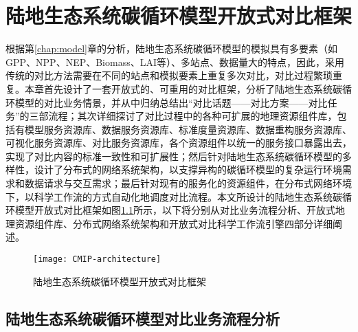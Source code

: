 \chapter{陆地生态系统碳循环模型开放式对比框架}

根据第\ref{chap:model}章的分析，陆地生态系统碳循环模型的模拟具有多要素（如GPP、NPP、NEP、Biomass、LAI等）、多站点、数据量大的特点，因此，采用传统的对比方法需要在不同的站点和模拟要素上重复多次对比，对比过程繁琐重复。本章首先设计了一套开放式的、可重用的对比框架，分析了陆地生态系统碳循环模型的对比业务情景，并从中归纳总结出“对比话题——对比方案——对比任务”的三部流程；其次详细探讨了对比过程中的各种可扩展的地理资源组件库，包括有模型服务资源库、数据服务资源库、标准度量资源库、数据重构服务资源库、可视化服务资源库、对比服务资源库，各个资源组件以统一的服务接口暴露出去，实现了对比内容的标准一致性和可扩展性；然后针对陆地生态系统碳循环模型的多样性，设计了分布式的网络系统架构，以支撑异构的碳循环模型的复杂运行环境需求和数据请求与交互需求；最后针对现有的服务化的资源组件，在分布式网络环境下，以科学工作流的方式自动化地调度对比流程。本文所设计的陆地生态系统碳循环模型开放式对比框架如图\ref{fig:CMIP-architecture}所示，以下将分别从对比业务流程分析、开放式地理资源组件库、分布式网络系统架构和开放式对比科学工作流引擎四部分详细阐述。

\begin{figure}
    \centering
    \texttt{[image: CMIP-architecture]}
    \caption{陆地生态系统碳循环模型开放式对比框架}
    \label{fig:CMIP-architecture}
\end{figure}

\section{陆地生态系统碳循环模型对比业务流程分析}
